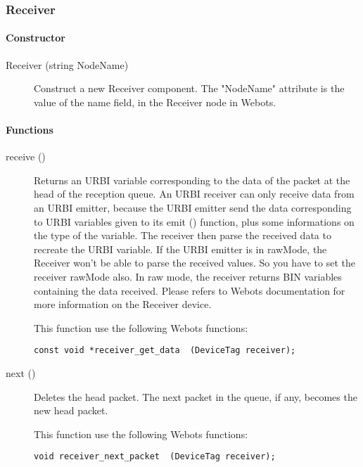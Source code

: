 \subsubsection{Receiver}
\label{webots.uobjects.robotdevices.receiver}%

\paragraph{Constructor}
\label{webots.uobjects.robotdevices.receiver.constructor}%

\noindent
\begin{description}
\item[{Receiver (string NodeName)}] Construct a new Receiver component. The "NodeName" attribute is the value
          of the name field, in the Receiver node in Webots.

\end{description}

\paragraph{Functions}
\label{webots.uobjects.robotdevices.receiver.functions}%

\noindent
\begin{description}
\item[{receive ()}] Returns an URBI variable corresponding to the data
  of the packet at the head of the reception queue. An URBI receiver
  can only receive data from an URBI emitter, because the URBI emitter
  send the data corresponding to URBI variables given to its emit ()
  function, plus some informations on the type of the variable. The
  receiver then parse the received data to recreate the URBI variable.
  If the URBI emitter is in rawMode, the Receiver won't be able to
  parse the received values.  So you have to set the receiver rawMode
  also. In raw mode, the receiver returns BIN variables containing the
  data received.  Please refers to Webots documentation for more
  information on the Receiver device.


          This function use the following Webots functions:


\begin{lstlisting}
const void *receiver_get_data  (DeviceTag receiver);
\end{lstlisting}
\item[{next ()}]           Deletes the head packet. The next packet in the queue, if any, becomes the
           new head packet.


          This function use the following Webots functions:


\begin{lstlisting}
void receiver_next_packet  (DeviceTag receiver);
\end{lstlisting}
\end{description}

